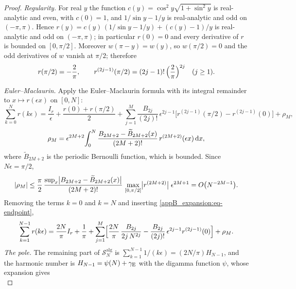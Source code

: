 \begin{proof}
\emph{Regularity.} For real $y$ the function $c(y)=\cos^{2}y\sqrt{1+\sin^{2}y}$ is real-analytic and even, with
$c(0)=1$, and $1/\sin y-1/y$ is real-analytic and odd on $(-\pi,\pi)$. Hence
$r(y)=c(y)\,(1/\sin y-1/y)+(c(y)-1)/y$ is real-analytic and odd on $(-\pi,\pi)$; in particular $r(0)=0$ and every
derivative of $r$ is bounded on $[0,\pi/2]$. Moreover $w(\pi-y)=w(y)$, so $w(\pi/2)=0$ and the odd derivatives of
$w$ vanish at $\pi/2$; therefore
\begin{equation}\label{appB_expansion:eq-endpoint}
  r(\pi/2)=-\frac2\pi,\qquad r^{(2j-1)}(\pi/2)=(2j-1)!\,\Bigl(\frac2\pi\Bigr)^{2j}\quad(j\ge1).
\end{equation}

\emph{Euler--Maclaurin.} Apply the Euler--Maclaurin formula with its integral remainder
\citep[Eq.~2.10.1, with $m=M+1$]{DLMF} to $x\mapsto r(\epsilon x)$ on $[0,N]$:
\begin{equation*}
  \sum_{k=0}^{N}r(k\epsilon)=\frac{I_r}{\epsilon}+\frac{r(0)+r(\pi/2)}{2}
  +\sum_{j=1}^{M}\frac{B_{2j}}{(2j)!}\,\epsilon^{2j-1}\bigl[r^{(2j-1)}(\pi/2)-r^{(2j-1)}(0)\bigr]+\rho_M ,
\end{equation*}
\begin{equation*}
  \rho_M=\epsilon^{2M+2}\!\int_{0}^{N}\frac{B_{2M+2}-\widetilde B_{2M+2}(x)}{(2M+2)!}\,r^{(2M+2)}(\epsilon x)\,\mathrm{d} x,
\end{equation*}
where $\widetilde B_{2M+2}$ is the periodic Bernoulli function, which is bounded. Since $N\epsilon=\pi/2$,
\begin{equation}\label{appB_expansion:eq-rho}
  |\rho_M|\le\frac\pi2\,\frac{\sup_x\bigl|B_{2M+2}-\widetilde B_{2M+2}(x)\bigr|}{(2M+2)!}\,
  \max_{[0,\pi/2]}\bigl|r^{(2M+2)}\bigr|\;\epsilon^{2M+1}=O\bigl(N^{-2M-1}\bigr).
\end{equation} Removing the terms $k=0$ and $k=N$ and inserting \eqref{appB_expansion:eq-endpoint},
\begin{equation*}
  \sum_{k=1}^{N-1}r(k\epsilon)=\frac{2N}{\pi}I_r+\frac1\pi
  +\sum_{j=1}^{M}\Bigl[\frac{2N}{\pi}\,\frac{B_{2j}}{2j\,N^{2j}}-\frac{B_{2j}}{(2j)!}\,\epsilon^{2j-1}r^{(2j-1)}(0)\Bigr]+\rho_M .
\end{equation*}
\emph{The pole.} The remaining part of $\mathcal S^{\mathrm{alg}}_N$ is $\sum_{k=1}^{N-1}1/(k\epsilon)=(2N/\pi)H_{N-1}$,
and the harmonic number is $H_{N-1}=\psi(N)+\gamma_{\mathrm{E}}$ with the digamma function $\psi$, whose expansion
\citep[Eqs.~5.4.14 and 5.11.2]{DLMF} gives
\begin{equation*}

\end{equation*}
\end{proof}
